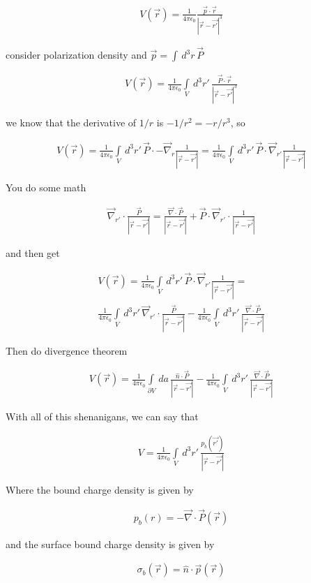 \documentclass[fleqn]{report}
\newcommand{\del}{\partial}
\newcommand{\equations} [1] {
\begin{gather*}
#1
\end{gather*}
}
\begin{document}
\equations{
    V(\vec r) = 
    \frac{1}{4 \pi \epsilon_0}
    \frac{\vec p \cdot \vec r }{|\vec r - \vec{r'}|^3}
}
consider polarization density and $\vec p = \int \, d^3 r \, \vec P$

\equations{
    V(\vec r) = 
    \frac{1}{4 \pi \epsilon_0}
    \int\limits_{V} \, d^3 r' \, 
    \frac{\vec P \cdot \vec r }{|\vec r - \vec{r'}|^3}
}

we know that the derivative of $1/r$ is $-1/r^2 = -r/r^3$, so 

\equations{
    V(\vec r) = 
    \frac{1}{4 \pi \epsilon_0}
    \int\limits_{V} \, d^3 r' \, 
    \vec P
    \cdot 
    -\vec \nabla_r
    \frac{1 }{|\vec r - \vec{r'}|}
    =
    \frac{1}{4 \pi \epsilon_0} 
    \int\limits_{V} \, d^3 r' \, 
    \vec P
    \cdot 
    \vec \nabla_{r'}
    \frac{1 }{|\vec r - \vec{r'}|}
}

You do some math 
\equations{
    \vec \nabla_{r'}
    \cdot 
    \frac{\vec P }{|\vec r - \vec{r'}|}
    =
    \frac{\vec \nabla \cdot \vec P }{|\vec r - \vec{r'}|}
    +
    \vec P
    \cdot 
    \vec \nabla_{r'}
    \cdot 
    \frac{1 }{|\vec r - \vec{r'}|}
}

and then get 
\equations{
    V(\vec r)
    =
    \frac{1}{4 \pi \epsilon_0} 
    \int\limits_{V} \, d^3 r' \, 
    \vec P
    \cdot 
    \vec \nabla_{r'}
    \frac{1 }{|\vec r - \vec{r'}|}
    =
    \\
    \frac{1}{4 \pi \epsilon_0} 
    \int\limits_{V} \, d^3 r' \, 
    \vec \nabla_{r'}
    \cdot 
    \frac{\vec P }{|\vec r - \vec{r'}|}
    -
    \frac{1}{4 \pi \epsilon_0} 
    \int\limits_{V} \, d^3 r' \, 
    \frac{\vec \nabla \cdot \vec P }{|\vec r - \vec{r'}|}
}

Then do divergence theorem 

\equations{
    V(\vec r)
    =
    \frac{1}{4 \pi \epsilon_0} 
    \int\limits_{\del V} \, d a \, 
    \frac{\hat n \cdot \vec P }{|\vec r - \vec{r'}|}
    -
    \frac{1}{4 \pi \epsilon_0} 
    \int\limits_{V} \, d^3 r' \, 
    \frac{\vec \nabla \cdot \vec P }{|\vec r - \vec{r'}|}
}

With all of this shenanigans, we can say that 
\equations{
    V 
    =
    \frac{1}{4 \pi \epsilon_0}
    \int\limits_V \, d^3 r' \, 
    \frac{p_b(\vec{r'})}{|\vec r - \vec{r'}|}
}

Where the bound charge density is given by 
\equations{
    p_b(r) = - \vec \nabla \cdot \vec P(\vec r)
}

and the surface bound charge density is given by 
\equations{
    \sigma_b(\vec r)
    =
    \hat n \cdot \vec p(\vec r)
}
\end{document}
